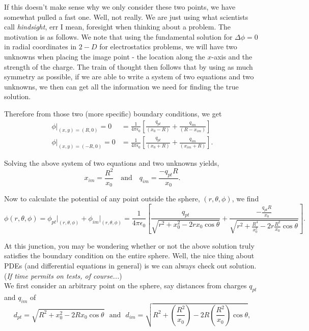 If this doesn't make sense why we only consider these two points, we have somewhat pulled a fast one. Well, not really. We are just using what scientists call \emph{hindsight}, err I mean, foresight when thinking about a problem. The motivation is as follows. We note that using the fundamental solution for $\Delta\phi=0$ in radial coordinates in $2-D$ for electrostatics problems, we will have two unknowns when placing the image point - the location along the $x$-axis and the strength of the charge. The train of thought then follows that by using as much symmetry as possible, if we are able to write a system of two equations and two unknowns, we then can get all the information we need for finding the true solution. 

Therefore from those two (more specific) boundary conditions, we get
\begin{align*}
\phi \Big|_{(x,y)=(R,0)} = 0 &=\frac{1}{4\pi\epsilon_0} \left[ \frac{q_{pt}}{(x_0 - R)} +  \frac{q_{im}}{(R-x_{im})} \right] \\
\phi\Big |_{(x,y)=(-R,0)} = 0  &= \frac{1}{4\pi\epsilon_0}\left[ \frac{q_{pt}}{(x_0 + R)}  +  \frac{q_{im}}{(x_{im}+R)} \right].
\end{align*}

Solving the above system of two equations and two unknowns yields, 
$$x_{im} = \frac{R^2}{x_0} \ \ \ \mbox{ and } \ \ \ q_{im} = \frac{-q_{pt} R}{x_0}.$$

Now to calculate the potential of any point outside the sphere, $(r,\theta,\phi)$, we find 
$$\phi(r,\theta,\phi) = \phi_{pt}\Big |_{(r,\theta,\phi)} + \phi_{im}\Big|_{(r,\theta,\phi)} = \frac{1}{4\pi\epsilon_0} \left[ \frac{q_{pt}}{\sqrt{r^2+x_0^2- 2rx_0\cos\theta}} + \frac{-\frac{q_{pt}R}{x_0}}{\sqrt{r^2+\frac{R^4}{x_0^2} - 2r\frac{R^2}{x_0}\cos\theta}}  \right].$$

At this junction, you may be wondering whether or not the above solution truly satisfies the boundary condition on the entire sphere. Well, the nice thing about PDEs (and differential equations in general) is we can always check out solution. (\emph{If time permits on tests, of course...})\\

We first consider an arbitrary point on the sphere, say distances from charges $q_{pt}$ and $q_{im}$ of
$$d_{pt} = \sqrt{R^2+x_0^2 -2Rx_0\cos\theta} \ \ \ \mbox{and} \ \ \ d_{im} = \sqrt{R^2+\left(\frac{R^2}{x_0}\right) - 2R\left(\frac{R^2}{x_0}\right)\cos\theta},$$

